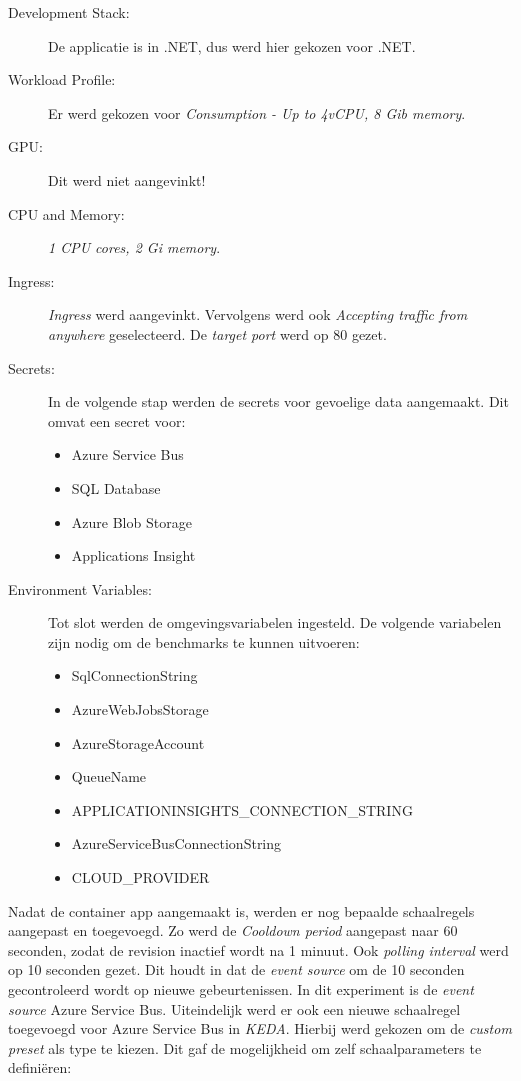 \begin{description}
    \item[Development Stack:] 
    De applicatie is in .NET, dus werd hier gekozen voor .NET.
    \item[Workload Profile:] 
    Er werd gekozen voor \textit{Consumption - Up to 4vCPU, 8 Gib memory}.
    \item[GPU:] 
    Dit werd niet aangevinkt!
    \item[CPU and Memory:] 
    \textit{1 CPU cores, 2 Gi memory}.
    \item[Ingress:]
    \textit{Ingress} werd aangevinkt. Vervolgens werd ook \textit{Accepting traffic from anywhere} geselecteerd. De \textit{target port} werd op 80 gezet.
    \item[Secrets:] 
    In de volgende stap werden de secrets voor gevoelige data aangemaakt. Dit omvat een secret voor:
    \begin{itemize}
        \item Azure Service Bus
        \item SQL Database
        \item Azure Blob Storage
        \item Applications Insight
    \end{itemize} 
    \item[Environment Variables:] 
    Tot slot werden de omgevingsvariabelen ingesteld. De volgende variabelen zijn nodig om de benchmarks te kunnen uitvoeren: 
    \begin{itemize}
        \item SqlConnectionString
        \item AzureWebJobsStorage
        \item AzureStorageAccount
        \item QueueName
        \item APPLICATIONINSIGHTS\_CONNECTION\_STRING
        \item AzureServiceBusConnectionString
        \item CLOUD\_PROVIDER
    \end{itemize}
\end{description}

Nadat de container app aangemaakt is, werden er nog bepaalde schaalregels aangepast en toegevoegd. Zo werd de \textit{Cooldown period} aangepast naar 60 seconden, zodat de revision inactief wordt na 1 minuut. Ook \textit{polling interval} werd op 10 seconden gezet. Dit houdt in dat de \textit{event source} om de 10 seconden gecontroleerd wordt op nieuwe gebeurtenissen. In dit experiment is de \textit{event source} Azure Service Bus. Uiteindelijk werd er ook een nieuwe schaalregel toegevoegd voor Azure Service Bus in \textit{KEDA}. Hierbij werd gekozen om de \textit{custom preset} als type te kiezen. Dit gaf de mogelijkheid om zelf schaalparameters te definiëren:
 
